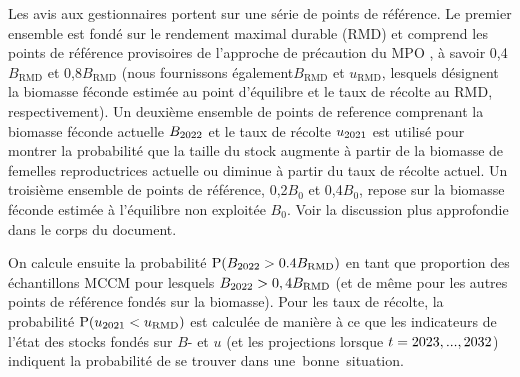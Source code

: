 \documentclass[11pt]{book}
\newcommand{\Bmsy}{B_\text{RMD}}
\newcommand{\umsy}{u_\text{RMD}}
\newcommand{\angL}{\guillemotleft\,}
\newcommand{\angR}{\,\guillemotright}
\begin{document}
Les avis aux gestionnaires portent sur une s\'{e}rie de points de r\'{e}f\'{e}rence.
Le premier ensemble est fond\'{e} sur le rendement maximal durable (RMD) et comprend les points de r\'{e}f\'{e}rence provisoires de l'approche de pr\'{e}caution du MPO \citep{DFO-SAR:2006_pa, DFO:2009_pa}, \`{a} savoir 0,4$\Bmsy$ et 0,8$\Bmsy$ (nous fournissons \'{e}galement$\Bmsy$ et $\umsy$, lesquels d\'{e}signent la biomasse f\'{e}conde estim\'{e}e au point d'\'{e}quilibre et le taux de r\'{e}colte au RMD, respectivement).
Un deuxi\`{e}me ensemble de points de reference comprenant la biomasse f\'{e}conde actuelle $B_{2022}$ et le taux de r\'{e}colte $u_{2021}$ est utilis\'{e} pour montrer la probabilit\'{e} que la taille du stock augmente \`{a} partir de la biomasse de femelles reproductrices actuelle ou diminue \`{a} partir du taux de r\'{e}colte actuel.
Un troisi\`{e}me ensemble de points de r\'{e}f\'{e}rence, 0,2$B_0$ et 0,4$B_0$, repose sur la biomasse f\'{e}conde estim\'{e}e \`{a} l'\'{e}quilibre non exploit\'{e}e $B_0$.
Voir la discussion plus approfondie dans le corps du document.


On calcule ensuite la probabilit\'{e} $\text{P}(B_{\finalYr} > 0.4\Bmsy)$ en tant que proportion des \Nbase{} \'{e}chantillons MCCM pour lesquels $B_{\finalYr} > 0,4\Bmsy$ (et de m\^{e}me pour les autres points de r\'{e}f\'{e}rence fond\'{e}s sur la biomasse).
Pour les taux de r\'{e}colte, la probabilit\'{e} $\text{P}(u_{\prevYear} < \umsy)$ est calcul\'{e}e de mani\`{e}re \`{a} ce que les indicateurs de l'\'{e}tat des stocks fond\'{e}s sur $B$- et $u$ (et les projections lorsque $t = 2023,...,2032$) indiquent la probabilit\'{e} de se trouver dans une \angL bonne\angR{} situation.
\end{document}
